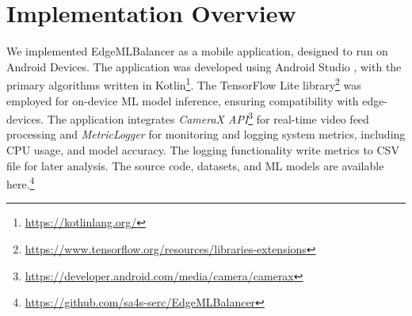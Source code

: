 \section{Implementation Overview}

We implemented EdgeMLBalancer as a mobile application, designed to run on Android Devices. The application was developed using Android Studio \cite{b24}, with the primary algorithms written in Kotlin\footnote{\url{https://kotlinlang.org/}}. The TensorFlow Lite library\footnote{\url{https://www.tensorflow.org/resources/libraries-extensions}} was employed for on-device ML model inference, ensuring compatibility with edge-devices. The application integrates \textit{CameraX API}\footnote{\url{https://developer.android.com/media/camera/camerax}} for real-time video feed processing and \textit{MetricLogger} for monitoring and logging system metrics, including CPU usage, and model accuracy. The logging functionality write metrics to CSV file for later analysis. The source code, datasets, and ML models are available here.\footnote{\url{https://github.com/sa4s-serc/EdgeMLBalancer}}
